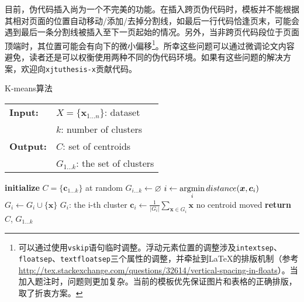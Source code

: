 目前，伪代码插入尚为一个不完美的功能。在插入跨页伪代码时，模板并不能根据其相对页面的位置自动移动/添加/去掉分割线，如最后一行代码恰逢页末，可能会遇到最后一条分割线被插入至下一页起始的情况。另外，当非跨页代码段位于页面顶端时，其位置可能会有向下的微小偏移\footnote{可以通过使用\texttt{vskip}语句临时调整。浮动元素位置的调整涉及\texttt{intextsep}、\texttt{floatsep}、\texttt{textfloatsep}三个属性的调整，并牵扯到\LaTeX 的排版机制（参考\url{http://tex.stackexchange.com/questions/32614/vertical-spacing-in-floats}）。当加入题注时，问题则更加复杂。当前的模板优先保证图片和表格的正确排版，取了折衷方案。}。所幸这些问题可以通过微调论文内容避免，读者还是可以权衡使用两种不同的伪代码环境。如果有这些问题的解决方案，欢迎向\texttt{xjtuthesis-x}贡献代码。

\begin{algorithm}[h]
  \caption{K-means算法}
  \label{alg:kmeans}
  \begin{tabular}{ll}
    \textbf{Input:}   & $X=\{\bm{x}_{1\dots n}\}$: dataset \\
                      & $k$: number of clusters \\
    \textbf{Output:}  & $C$: set of centroids \\
                      & $G_{1 \ldots k}$: the set of clusters \\
  \end{tabular}
  \algomidrule
  \begin{algorithmic}[1]
      \State \textbf{initialize} $C=\{\bm{c}_{1 \dots k}\}$ at random
      \Repeat
        \State $G_{i \dots k} \leftarrow \varnothing$
          \State $i \leftarrow \operatorname*{argmin}\limits_i distance(\bm{x}, \bm{c}_i)$
          \State $G_i \leftarrow G_i \cup \{\bm{x}\}$
          \Comment $G_i$: the i-th cluster
        \EndFor
        \State $\bm{c}_i \leftarrow \frac{1}{|G_i|}\sum\limits_{\bm{x} \in G_i} {\bm{x}}$
      \Until no centroid moved
      \State \textbf{return} $C$, $G_{1 \ldots k}$
    \EndProcedure
  \end{algorithmic}
\end{algorithm}

